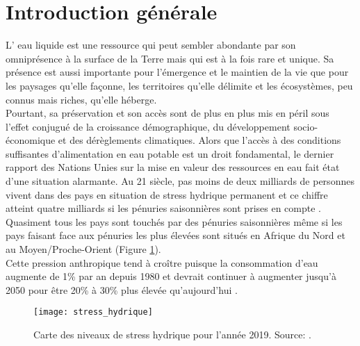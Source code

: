 \chapter*{{\selectfont Introduction générale}}
\label{chap:intro_géné}
 

L' eau liquide est une ressource qui peut sembler abondante par son omniprésence à la surface de la Terre mais qui est à la fois rare et unique. Sa présence est aussi importante pour l'émergence et le maintien de la vie que pour les paysages qu'elle façonne, les territoires qu'elle délimite et les écosystèmes, peu connus mais riches, qu'elle héberge.\\
Pourtant, sa préservation et son accès sont de plus en plus mis en péril sous l'effet conjugué de la croissance démographique, du développement socio-économique et des dérèglements climatiques. Alors que l'accès à des conditions suffisantes d'alimentation en eau potable est un droit fondamental, le dernier rapport des Nations Unies sur la mise en valeur des ressources en eau fait état d'une situation alarmante. Au 21\ieme{} siècle, pas moins de deux milliards de personnes vivent dans des pays en situation de stress hydrique permanent et ce chiffre atteint quatre milliards si les pénuries saisonnières sont prises en compte \citep{WDDR2019}. Quasiment tous les pays sont touchés par des pénuries saisonnières même si les pays faisant face aux pénuries les plus élevées sont situés en Afrique du Nord et au Moyen/Proche-Orient (Figure \ref{stress_hydrique}).\\ 
Cette pression anthropique tend à croître puisque la consommation d'eau augmente de 1\% par an depuis 1980 et devrait continuer à augmenter jusqu'à 2050 pour être 20\% à 30\% plus élevée qu'aujourd'hui \citep{burek2016}.\\

\begin{figure}[h!]
\texttt{[image: stress\_hydrique]}
\caption{Carte des niveaux de stress hydrique pour l'année 2019. Source: \citet{WDDR2019}.}
\label{stress_hydrique}
\end{figure}



